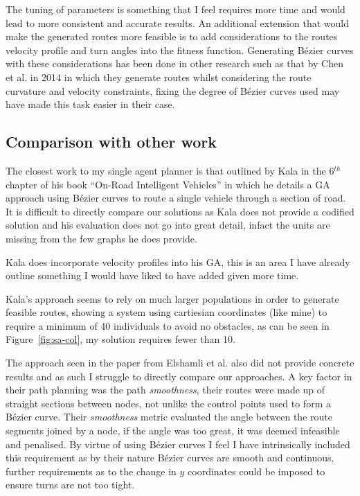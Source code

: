 The tuning of parameters is something that I feel requires more time and would lead to more consistent and accurate results. An additional extension that would make the generated routes more feasible is to add considerations to the routes velocity profile and turn angles into the fitness function. Generating Bézier curves with these considerations has been done in other research such as that by Chen et al.\cite{chenQuarticBezierCurve2014} in 2014 in which they generate routes whilst considering the route curvature and velocity constraints, fixing the degree of Bézier curves used may have made this task easier in their case.

\subsection{Comparison with other work}

The closest work to my single agent planner is that outlined by Kala in the 6$^{th}$ chapter of his book ``On-Road Intelligent Vehicles'' in which he details a GA approach using Bézier curves to route a single vehicle through a section of road. It is difficult to directly compare our solutions as Kala does not provide a codified solution and his evaluation does not go into great detail, infact the units are missing from the few graphs he does provide.

Kala does incorporate velocity profiles into his GA, this is an area I have already outline something I would have liked to have added given more time.

Kala's approach seems to rely on much larger populations in order to generate feasible routes, showing a system using cartiesian coordinates (like mine) to require a minimum of 40 individuals to avoid no obstacles, as can be seen in Figure~\ref{fig:sa-col}, my solution requires fewer than 10.

The approach seen in the paper from Elshamli et al.\cite{elshamliGeneticAlgorithmDynamic2004} also did not provide concrete results and as such I struggle to directly compare our approaches. A key factor in their path planning was the path \textit{smoothness}, their routes were made up of straight sections between nodes, not unlike the control points used to form a Bézier curve. Their \textit{smoothness} metric evaluated the angle between the route segments joined by a node, if the angle was too great, it was deemed infeasible and penalised. By virtue of using Bézier curves I feel I have intrinsically included this requirement as by their nature Bézier curves are smooth and continuous, further requirements as to the change in $y$ coordinates could be imposed to ensure turns are not too tight.

